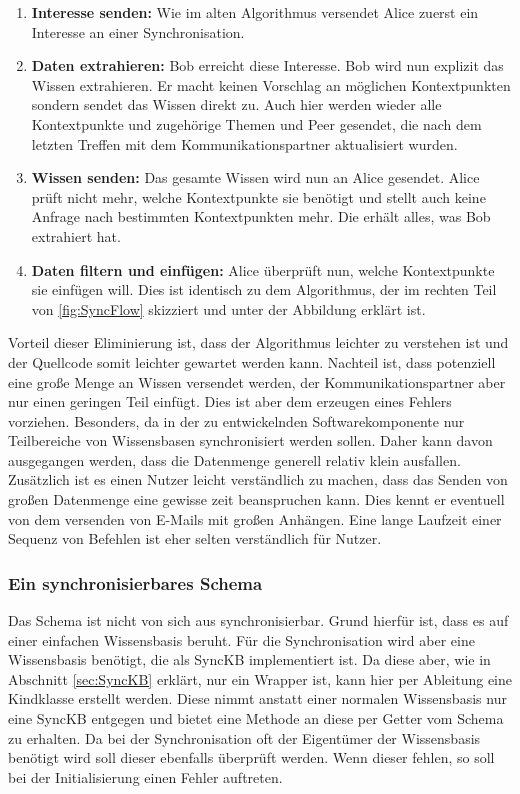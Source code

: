 \documentclass[a4paper]{article}
\begin{document}
	\begin{enumerate}
		\item \textbf{Interesse senden:} Wie im alten Algorithmus versendet Alice
		zuerst ein Interesse an einer Synchronisation.
		\item \textbf{Daten extrahieren:} Bob erreicht diese Interesse. Bob
		wird nun explizit das Wissen extrahieren. Er macht keinen Vorschlag an
		möglichen Kontextpunkten sondern sendet das Wissen direkt zu. Auch
		hier werden wieder alle Kontextpunkte und zugehörige Themen und Peer 
		gesendet, die nach dem letzten Treffen mit dem Kommunikationspartner
		aktualisiert wurden.
		\item \textbf{Wissen senden:} Das gesamte Wissen wird nun an Alice gesendet.
		Alice prüft nicht mehr, welche Kontextpunkte sie benötigt und stellt auch
		keine Anfrage nach bestimmten Kontextpunkten mehr. Die erhält alles, was
		Bob extrahiert hat.
		\item \textbf{Daten filtern und einfügen:} Alice überprüft nun, welche
		Kontextpunkte sie einfügen will. Dies ist identisch zu dem Algorithmus,
		der im rechten Teil von \autoref{fig:SyncFlow} skizziert und unter der
		Abbildung erklärt ist.
	\end{enumerate} 	
		
	Vorteil dieser Eliminierung ist, dass der Algorithmus leichter zu verstehen ist 
	und	der Quellcode somit leichter gewartet werden kann. Nachteil ist, dass
	potenziell eine große Menge an Wissen versendet werden, der 
	Kommunikationspartner aber nur einen geringen Teil einfügt. Dies ist aber
	dem erzeugen eines Fehlers vorziehen. Besonders, da in der zu entwickelnden
	Softwarekomponente nur Teilbereiche von Wissensbasen synchronisiert werden
	sollen. Daher kann davon ausgegangen werden, dass die Datenmenge generell
	relativ klein ausfallen. Zusätzlich ist es einen Nutzer leicht verständlich zu
	machen, dass das Senden von großen Datenmenge eine gewisse zeit beanspruchen
	kann. Dies kennt er eventuell von dem versenden von E-Mails mit großen Anhängen.
	Eine lange Laufzeit einer Sequenz von Befehlen ist eher selten verständlich für
	Nutzer.	 
	
	\subsubsection{Ein synchronisierbares Schema}
	
	Das Schema ist nicht von sich aus synchronisierbar. Grund hierfür ist, dass es
	auf einer einfachen Wissensbasis beruht. Für die Synchronisation wird aber
	eine Wissensbasis benötigt, die als SyncKB implementiert ist. Da diese aber,
	wie in Abschnitt \ref{sec:SyncKB} erklärt, nur ein Wrapper ist, kann hier per
	Ableitung  eine	Kindklasse erstellt werden. Diese nimmt anstatt einer normalen
	Wissensbasis nur eine SyncKB entgegen und bietet eine Methode an diese per
	Getter vom Schema zu erhalten. Da bei der Synchronisation oft der Eigentümer
	der Wissensbasis benötigt wird soll dieser ebenfalls überprüft werden. Wenn
	dieser fehlen, so soll bei der Initialisierung einen Fehler auftreten. \\
	
\end{document}
